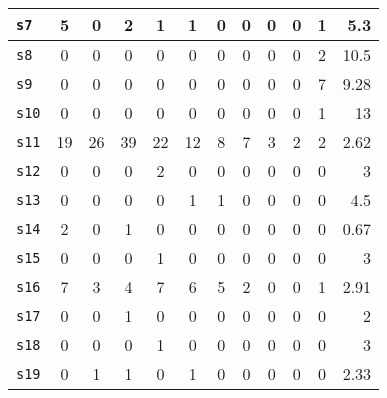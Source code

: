 \begin{table}[t]
{\begin{tabular}{l c c c c c c c c c c r}
	{\tt s7}&
	\cellcolor{black!10} 5 & 0& \cellcolor{black!10} 2 & \cellcolor{black!10} 1& \cellcolor{black!10} 1& 0& 0& 0& 0& \cellcolor{black!10} 1 & 5.3
	\\ \midrule
	
	{\tt s8}&
	0 & 0& 0& 0& 0& 0& 0& 0& 0& \cellcolor{black!10} 2 & 10.5
	\\ \midrule
	
	{\tt s9}&
	0 & 0& 0& 0& 0& 0& 0& 0& 0& \cellcolor{black!10} 7 & 9.28
	\\ \midrule	
	
	{\tt s10}&
    0 & 0& 0& 0& 0& 0& 0& 0& 0& \cellcolor{black!10} 1 & 13
	\\ \midrule
	
	{\tt s11}&
	\cellcolor{black!20}19 & \cellcolor{black!20}26& \cellcolor{black!30}39& \cellcolor{black!20}22& \cellcolor{black!10} 12& \cellcolor{black!10} 8 & \cellcolor{black!10} 7& \cellcolor{black!10} 3& \cellcolor{black!10} 2 & \cellcolor{black!10} 2 & 2.62
	\\ \midrule
	
	{\tt s12}&
	0 & 0& 0& \cellcolor{black!10} 2& 0& 0& 0& 0& 0& 0 & 3
	\\ \midrule
	
	
	{\tt s13} &
	0 & 0& 0& 0& \cellcolor{black!10} 1& \cellcolor{black!10} 1& 0& 0& 0& 0 & 4.5
	\\ \midrule
	

	
	{\tt s14}&
	\cellcolor{black!10} 2 & 0& \cellcolor{black!10} 1& 0& 0& 0& 0& 0& 0& 0 & 0.67
	\\ \midrule
	
	{\tt s15}&
	0 & 0& 0& \cellcolor{black!10} 1& 0& 0& 0& 0& 0& 0 & 3
	\\ \midrule
	
	{\tt s16}&
	\cellcolor{black!10} 7 & \cellcolor{black!10} 3& \cellcolor{black!10} 4& \cellcolor{black!10} 7& \cellcolor{black!10} 6& \cellcolor{black!10} 5& \cellcolor{black!10} 2& 0& 0& \cellcolor{black!10} 1 & 2.91
	\\ \midrule
	
	{\tt s17}&
	0 & 0& \cellcolor{black!10} 1& 0& 0& 0& 0& 0& 0& 0 & 2
	\\ \midrule	
	
	{\tt s18}&
    0 & 0& 0& \cellcolor{black!10} 1& 0& 0& 0& 0& 0& 0 & 3
	\\ \midrule	
		
	{\tt s19}&
    0 & \cellcolor{black!10} 1& \cellcolor{black!10} 1& 0& \cellcolor{black!10} 1& 0& 0& 0& 0& 0 & 2.33
	\\ \midrule
		

\end{tabular}}
\end{table}
